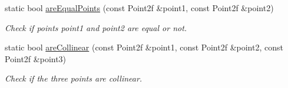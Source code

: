 \begin{DoxyCompactItemize}
static bool \hyperlink{classmultiscale_1_1Geometry2D_aa2d3ac595072b9ab61879a44629d7969}{are\-Equal\-Points} (const Point2f \&point1, const Point2f \&point2)
\begin{DoxyCompactList}\small\item\em Check if points point1 and point2 are equal or not. \end{DoxyCompactList}\item 
static bool \hyperlink{classmultiscale_1_1Geometry2D_aa8b75808a35a471becae0ad99e708bdd}{are\-Collinear} (const Point2f \&point1, const Point2f \&point2, const Point2f \&point3)
\begin{DoxyCompactList}\small\item\em Check if the three points are collinear. \end{DoxyCompactList}\end{DoxyCompactItemize}
